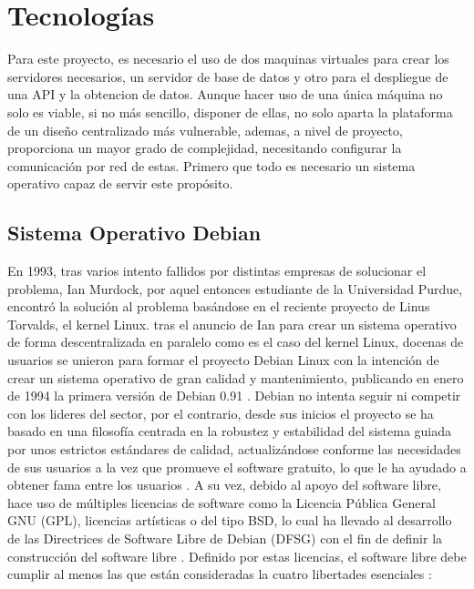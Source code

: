 \chapter[Tecnologías]{Tecnologías}
\label{Chap3}

Para este proyecto, es necesario el uso de dos maquinas virtuales para crear los servidores necesarios, un servidor de base de datos y otro para el despliegue de una API y la obtencion de datos. Aunque hacer uso de una única máquina no solo es viable, si no más sencillo, disponer de ellas, no solo aparta la plataforma de un diseño centralizado más vulnerable, ademas, a nivel de proyecto, proporciona un mayor grado de complejidad, necesitando configurar la comunicación por red de estas.\newline
\newline
Primero que todo es necesario un sistema operativo capaz de servir este propósito.

\section{Sistema Operativo Debian}
En 1993, tras varios intento fallidos por distintas empresas de solucionar el problema, Ian Murdock, por aquel entonces estudiante de la Universidad Purdue, encontró la solución al problema basándose en el reciente proyecto de Linus Torvalds, el kernel Linux. tras el anuncio de Ian para crear un sistema operativo de forma descentralizada en paralelo como es el caso del kernel Linux, docenas de usuarios se unieron para formar el proyecto Debian Linux con la intención de crear un sistema operativo de gran calidad y mantenimiento, publicando en enero de 1994 la primera versión de Debian 0.91 \cite{krafft2005debian} \cite{DebHis}.\newline
\newline
Debian no intenta seguir ni competir con los lideres del sector, por el contrario, desde sus inicios el proyecto se ha basado en una filosofía centrada en la robustez y estabilidad del sistema guiada por unos estrictos estándares de calidad, actualizándose conforme las necesidades de sus usuarios a la vez que promueve el software gratuito, lo que le ha ayudado a obtener fama entre los usuarios \cite{DebFil} \cite{pollei2013debian}.\newline
\newline
A su vez, debido al apoyo del software libre, hace uso de múltiples licencias de software como la Licencia Pública General GNU (GPL), licencias artísticas o del tipo BSD, lo cual ha llevado al desarrollo de las Directrices de Software Libre de Debian (DFSG) con el fin de definir la construcción del software libre \cite{DebFree}.\newline
\newline
Definido por estas licencias, el software libre debe cumplir al menos las que están consideradas la cuatro libertades esenciales \cite{GnuFS}:

